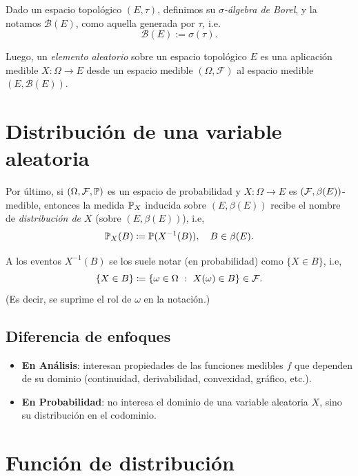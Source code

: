 \begin{definition}
    Dado un espacio topológico \((E, \tau)\), definimos su \textit{\(\sigma\)-álgebra de Borel}, y la notamos \(\mathcal{B}(E)\), como aquella generada por \(\tau\), i.e.
    \[
    \mathcal{B}(E) := \sigma(\tau).
    \]
\end{definition}
\medskip \par
Luego, un \textit{elemento aleatorio} sobre un espacio topológico \(E\) es una aplicación medible \(X: \Omega \to E\) desde un espacio medible \((\Omega, \mathcal{F})\) al espacio medible \((E, \mathcal{B}(E))\). \par

\section{Distribución de una variable aleatoria}

Por último, si $(\Omega, \mathcal{F}, \mathbb{P})$ es un espacio de probabilidad y $X \colon \Omega \to E$ es $(\mathcal{F}, \beta(E))$-medible, entonces la medida $\mathbb{P}_{X}$ inducida sobre $(E, \beta(E))$ recibe el nombre de \textit{distribución de $X$} (sobre $(E, \beta(E))$), i.e,
\[ \mathbb{P}_{X}(B) \coloneq \mathbb{P}(X^{-1}(B)), \quad B \in \beta(E). \]

A los eventos $X^{-1}(B)$ se los suele notar (en probabilidad) como $\{X \in B\}$, i.e, 
\[ \{X \in B\} \coloneq \{\omega \in \Omega \ : \ X(\omega) \in B\} \in \mathcal{F}. \]
(Es decir, se suprime el rol de $\omega$ en la notación.)   

\subsection{Diferencia de enfoques}

\begin{itemize}
    \item \textbf{En Análisis}: interesan propiedades de las funciones medibles \(f\) que dependen de su dominio (continuidad, derivabilidad, convexidad, gráfico, etc.).
    \item \textbf{En Probabilidad}: no interesa el dominio de una variable aleatoria \(X\), sino su distribución en el codominio.
\end{itemize}

\section{Función de distribución}

